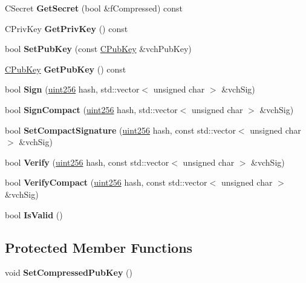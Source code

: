 \begin{DoxyCompactItemize}
C\+Secret {\bfseries Get\+Secret} (bool \&f\+Compressed) const
\item 
\mbox{\label{class_c_key_a91b6ecf71cc16e0b05ce79ec9276e729}} 
C\+Priv\+Key {\bfseries Get\+Priv\+Key} () const
\item 
\mbox{\label{class_c_key_a243517185c6bb7697640fe5d2639077f}} 
bool {\bfseries Set\+Pub\+Key} (const \mbox{\hyperlink{class_c_pub_key}{C\+Pub\+Key}} \&vch\+Pub\+Key)
\item 
\mbox{\label{class_c_key_aa1085c59603a62db6ec776300f250337}} 
\mbox{\hyperlink{class_c_pub_key}{C\+Pub\+Key}} {\bfseries Get\+Pub\+Key} () const
\item 
\mbox{\label{class_c_key_a01a5bd0d698ae87715a3c3ed10322885}} 
bool {\bfseries Sign} (\mbox{\hyperlink{classuint256}{uint256}} hash, std\+::vector$<$ unsigned char $>$ \&vch\+Sig)
\item 
\mbox{\label{class_c_key_affc5fc73d9f24df5cf9ca43c54df66e5}} 
bool {\bfseries Sign\+Compact} (\mbox{\hyperlink{classuint256}{uint256}} hash, std\+::vector$<$ unsigned char $>$ \&vch\+Sig)
\item 
\mbox{\label{class_c_key_a244e1d93cb42ec6f064eb88593a80d61}} 
bool {\bfseries Set\+Compact\+Signature} (\mbox{\hyperlink{classuint256}{uint256}} hash, const std\+::vector$<$ unsigned char $>$ \&vch\+Sig)
\item 
\mbox{\label{class_c_key_a24d1bee17b43d9a5322a0827c3325e8a}} 
bool {\bfseries Verify} (\mbox{\hyperlink{classuint256}{uint256}} hash, const std\+::vector$<$ unsigned char $>$ \&vch\+Sig)
\item 
\mbox{\label{class_c_key_a0bb1b5a5a011539b582b785330ef01ba}} 
bool {\bfseries Verify\+Compact} (\mbox{\hyperlink{classuint256}{uint256}} hash, const std\+::vector$<$ unsigned char $>$ \&vch\+Sig)
\item 
\mbox{\label{class_c_key_a1f368a65eb50efe5b4dff5a481795dec}} 
bool {\bfseries Is\+Valid} ()
\end{DoxyCompactItemize}
\subsection*{Protected Member Functions}
\begin{DoxyCompactItemize}
\item 
\mbox{\label{class_c_key_ab1b7a4447a2d033865986bf4ab33c8d3}} 
void {\bfseries Set\+Compressed\+Pub\+Key} ()
\end{DoxyCompactItemize}
